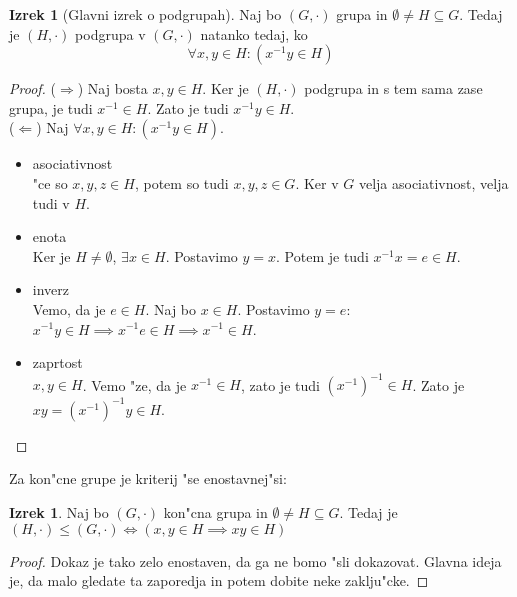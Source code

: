 \documentclass[11pt, a4paper]{article}
\theoremstyle{definition}
\newtheorem{theorem}[counter]{Izrek}
\theoremstyle{remark}
\begin{document}
	\begin{theorem}[Glavni izrek o podgrupah]\label{glavniIzrekPodrgup}
		Naj bo $(G, \cdot)$ grupa in $\emptyset \neq H \subseteq G$. Tedaj je $(H, \cdot)$ podgrupa v $(G, \cdot)$ natanko tedaj, ko
		\[ \forall x,y \in H: (x^{-1}y \in H) \]
	\end{theorem}
	\begin{proof}
		($\Rightarrow$) Naj bosta $x,y \in H$. Ker je $(H, \cdot)$ podgrupa in s tem sama zase grupa, je tudi $x^{-1} \in H$. Zato je tudi $x^{-1}y \in H$.
		\\
		($\Leftarrow$) Naj $\forall x,y \in H: (x^{-1}y \in H)$.
		\begin{itemize}
			\item asociativnost \\
			"ce so $x,y,z \in H$, potem so tudi $x,y,z \in G$. Ker v $G$ velja asociativnost, velja tudi v $H$.
			
			\item enota \\
			Ker je $H \neq \emptyset$, $\exists x \in H$. Postavimo $y = x$. Potem je tudi $x^{-1}x = e \in H$.
			
			\item inverz \\
			Vemo, da je $e \in H$. Naj bo $x \in H$. Postavimo $y = e$: $x^{-1}y \in H \implies x^{-1}e \in H \implies x^{-1} \in H$.
			
			\item zaprtost \\
			$x, y \in H$. Vemo "ze, da je $x^{-1} \in H$, zato je tudi $(x^{-1})^{-1} \in H$. Zato je $xy = (x^{-1})^{-1}y \in H$.
		\end{itemize}
	\end{proof}
	
	Za kon"cne grupe je kriterij "se enostavnej"si:
	\begin{theorem}
		Naj bo $(G, \cdot)$ kon"cna grupa in $\emptyset \neq H \subseteq G$. Tedaj je $(H, \cdot) \leq (G, \cdot) \iff (x,y \in H \implies xy \in H)$
	\end{theorem}
	\begin{proof}
		Dokaz je tako zelo enostaven, da ga ne bomo "sli dokazovat. Glavna ideja je, da malo gledate ta zaporedja in potem dobite neke zaklju"cke. %
	\end{proof}
	
\end{document}
